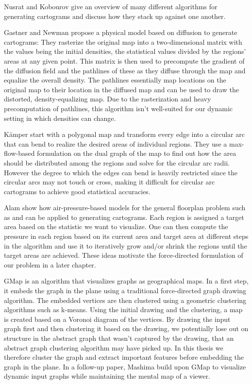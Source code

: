 Nusrat and Kobourov \cite{nusrat2016state} give an overview of many different algorithms for generating cartograms and discuss how they stack up against one another.

Gastner and Newman \cite{gastner2004diffusion} propose a physical model based on diffusion to generate cartograms: They rasterize the original map into a two-dimensional matrix with the values being the initial densities, \ie{} the statistical values divided by the regions' areas at any given point. This matrix is then used to precompute the gradient of the diffusion field and the pathlines of these  as they diffuse through the map and equalize the overall density. The pathlines essentially map locations on the original map to their location in the diffused map and can be used to draw the distorted, density-equalizing map. Due to the rasterization and heavy precomputation of pathlines, this algorithm isn't well-suited for our dynamic setting in which densities can change.

Kämper \etal{} \cite{kamper2013circular} start with a polygonal map and transform every edge into a circular arc that can bend to realize the desired areas of individual regions. They use a max-flow-based formulation on the dual graph of the map to find out how the area should be distributed among the regions and solve for the circular arc radii. However the degree to which the edges can bend is heavily restricted since the circular arcs may not touch or cross, making it difficult for circular arc cartograms to achieve good statistical accuracies.

Alam \etal{} \cite{alam2013computing} show how air-pressure-based models for the general floorplan problem such as \cite{izumi1998air} and \cite{felsner2013exploiting} can be applied to generating cartograms. Each region is assigned a target area based on the statistic we want to visualize. One can then compute the pressure in each region based on its current area and target area at different steps in the algorithm and use it to iteratively grow and/or shrink the regions until the target areas are achieved. These ideas motivate the force-directed formulation of our problem in a later chapter.

GMap \cite{gansner2009gmap} is an algorithm that visualizes graphs as geographical maps. In a first step, it embeds the graph in the plane using a traditional force-directed graph drawing algorithm. The embedded vertices are then clustered using a geometric clustering algorithms such as k-means. Using the initial drawing and the clustering, a map is created based on a Voronoi diagram of the vertices. By drawing the input graph first and then clustering it based on the drawing, we potentially lose out on structure in the abstract graph that wasn't captured by the drawing, that an abstract graph clustering algorithm may have picked up. In this thesis we therefore cluster the graph and extract important features before embedding the graph in the plane. In a follow-up paper, Mashima \etal{} \cite{mashima2011visualizing} build upon GMap to visualize dynamic input graphs while maintaining the mental map of a viewer.
